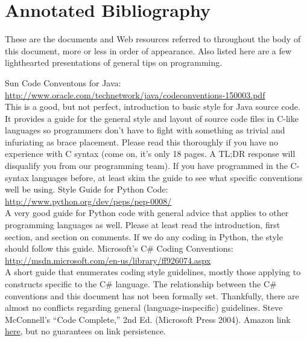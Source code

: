 \documentclass[12pt]{article}
\begin{document}
\section{Annotated Bibliography}
These are the documents and Web resources referred to throughout the body of this document, more or less in order of appearance. Also listed here are a few lighthearted presentations of general tips on programming.
\label{sec:references}
\begingroup
\renewcommand{\section}[2]{}
\begin{thebibliography}{9}
     Sun Code Conventons for Java: \url{http://www.oracle.com/technetwork/java/codeconventions-150003.pdf} \\
        This is a good, but not perfect, introduction to basic style for Java source code. It provides a guide for the general style and layout of source code files in C-like languages so programmers don't have to fight with something as trivial and infuriating as brace placement. Please read this thoroughly if you have no experience with C syntax (come on, it's only 18 pages. A TL;DR response will disqualify you from our programming team). If you have programmed in the C-syntax languages before, at least skim the guide to see what specific conventions well be using.
     Style Guide for Python Code: \url{http://www.python.org/dev/peps/pep-0008/} \\
        A very good guide for Python code with general advice that applies to other programming languages as well. Please at least read the introduction, first section, and section on comments. If we do any coding in Python, the style should follow this guide.
     Microsoft's C\# Coding Conventions: \url{http://msdn.microsoft.com/en-us/library/ff926074.aspx}\\
        A short guide that enumerates coding style guidelines, mostly those applying to constructs specific to the C\# language. The relationship between the C\# conventions and this document has not been formally set. Thankfully, there are almost no conflicts regarding general (language-inspecific) guidelines.
     Steve McConnell's ``Code Complete,'' 2nd Ed. (Microsoft Press 2004). Amazon link \href{http://www.amazon.com/Code-Complete-Practical-Handbook-Construction/dp/0735619670/ref=sr_1_1?ie=UTF8&qid=1388369682&sr=8-1&keywords=code+complete}{here}, but no guarantees on link persistence.\\

\end{thebibliography}
\end{document}
